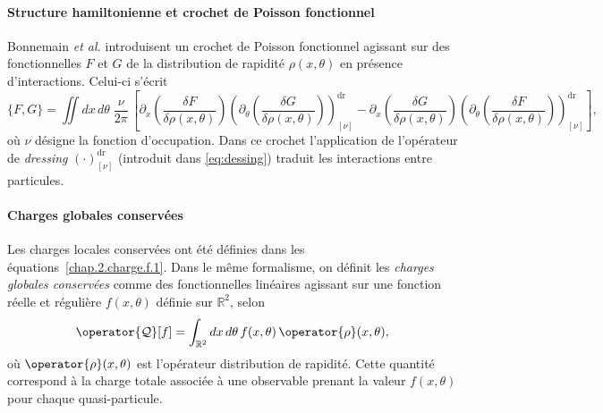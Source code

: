 \paragraph{Structure hamiltonienne et crochet de Poisson fonctionnel}  
Bonnemain \emph{et al.} \cite{bonnemain2024hamiltonian} introduisent un crochet de Poisson fonctionnel agissant sur des fonctionnelles $F$ et $G$ de la distribution de rapidité $\rho(x,\theta)$ en présence d’interactions. Celui-ci s’écrit
\begin{equation}\label{chap:GHD:eq.chochet.bonnemain.1}
	\{F,G\}
	=\iint dx\,d\theta\;\frac{\nu}{2\pi}\,
	\left[
		\partial_x \left( \frac{\delta F}{\delta \rho(x,\theta)} \right)
		\left( \partial_\theta \left( \frac{\delta G}{\delta \rho(x,\theta)} \right) \right)^{\mathrm{dr}}_{[\nu]}
		-
		\partial_x \left( \frac{\delta G}{\delta \rho(x,\theta)} \right)
		\left( \partial_\theta \left( \frac{\delta F}{\delta \rho(x,\theta)} \right) \right)^{\mathrm{dr}}_{[\nu]}
	\right],
\end{equation}
où $\nu$ désigne la fonction d’occupation. Dans ce crochet l'application de l’opérateur de \emph{dressing} $(\cdot)^{\mathrm{dr}}_{[\nu]}$ (introduit dans \eqref{eq:dessing})  traduit les interactions entre particules.


\medskip

\paragraph{Charges globales conservées}  
Les charges locales conservées ont été définies dans les équations~\eqref{chap.2.charge.f.1}.  
Dans le même formalisme, on définit les \emph{charges globales conservées} comme des fonctionnelles linéaires agissant sur une fonction réelle et régulière $f(x,\theta)$ définie sur $\mathbb{R}^2$, selon
\begin{equation}\label{chap:GHD:eq.charge.global.0}
	\operator{\mathcal{Q}}[f] 
	= \int_{\mathbb{R}^2} dx\, d\theta\, f(x, \theta)\, \operator{\rho}(x, \theta),
\end{equation}
où $\operator{\rho}(x,\theta)$ est l'opérateur distribution de rapidité.  
Cette quantité correspond à la charge totale associée à une observable prenant la valeur $f(x,\theta)$ pour chaque quasi-particule.

